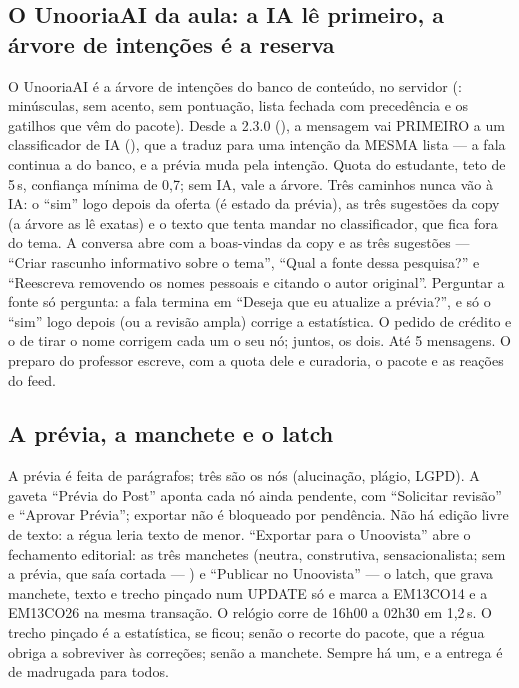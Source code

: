 \subsection{O UnooriaAI da aula: a IA lê primeiro, a árvore de intenções é a reserva}

O UnooriaAI é a árvore de intenções do banco de conteúdo, no servidor
(: minúsculas, sem acento, sem pontuação, lista
fechada com precedência e os gatilhos que vêm do pacote). Desde a 2.3.0
(), a mensagem vai PRIMEIRO a um classificador de IA
(), que a traduz para uma intenção da MESMA lista
--- a fala continua a do banco, e a prévia muda pela intenção. Quota do
estudante, teto de 5\,s, confiança mínima de 0,7; sem IA, vale a árvore.
Três caminhos nunca vão à IA: o \enquote{sim} logo depois da oferta (é estado
da prévia), as três sugestões da copy (a árvore as lê exatas) e o texto que
tenta mandar no classificador, que fica fora do tema. A conversa abre com a boas-vindas da copy e as três sugestões ---
\enquote{Criar rascunho informativo sobre o tema}, \enquote{Qual a fonte dessa
pesquisa?} e \enquote{Reescreva removendo os nomes pessoais e citando o autor
original}. Perguntar a fonte só pergunta: a fala termina em \enquote{Deseja
que eu atualize a prévia?}, e só o \enquote{sim} logo depois (ou a revisão
ampla) corrige a estatística. O pedido de crédito e o de tirar o nome corrigem
cada um o seu nó; juntos, os dois. Até 5 mensagens. O preparo do professor
escreve, com a quota dele e curadoria, o pacote e as reações do feed.

\subsection{A prévia, a manchete e o latch}

A prévia é feita de parágrafos; três são os nós (alucinação, plágio, LGPD). A
gaveta \enquote{Prévia do Post} aponta cada nó ainda pendente, com
\enquote{Solicitar revisão} e \enquote{Aprovar Prévia}; exportar não é
bloqueado por pendência. Não há edição livre de texto: a régua leria texto de
menor. \enquote{Exportar para o Unoovista} abre o fechamento editorial: as
três manchetes (neutra, construtiva, sensacionalista; sem a prévia, que saía
cortada --- ) e
\enquote{Publicar no Unoovista} --- o latch, que grava manchete, texto e trecho
pinçado num UPDATE só e marca a EM13CO14 e a EM13CO26 na mesma transação. O
relógio corre de 16h00 a 02h30 em 1,2\,s. O trecho pinçado é a estatística, se
ficou; senão o recorte do pacote, que a régua obriga a sobreviver às
correções; senão a manchete. Sempre há um, e a entrega é de madrugada para
todos.

